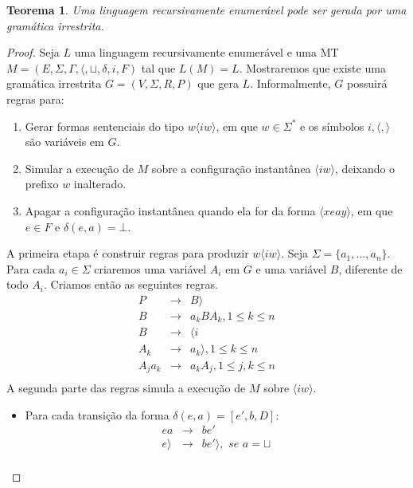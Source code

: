 \documentclass[a4paper]{article}
\newtheorem{Theorem}{Teorema}
\theoremstyle{definition}
\begin{document}
  \begin{Theorem}
    Uma linguagem recursivamente enumerável pode ser gerada por uma gramática
    irrestrita.
  \end{Theorem}
  \begin{proof}
    Seja $L$ uma linguagem recursivamente enumerável e uma MT $M = (E,\Sigma,\Gamma,
    \langle, \sqcup, \delta,i,F)$ tal que $L(M) = L$. Mostraremos que
    existe uma gramática irrestrita $G = (V,\Sigma,R,P)$ que gera $L$.
    Informalmente, $G$ possuirá regras para:
    \begin{enumerate}
      \item Gerar formas sentenciais do tipo $w\langle i w \rangle$, em que $w
        \in \Sigma^*$ e os símbolos $i, \langle, \rangle$ são variáveis em $G$.
      \item Simular a execução de $M$ sobre a configuração instantânea $\langle
        i w\rangle$, deixando o prefixo $w$ inalterado.
      \item Apagar a configuração instantânea quando ela for da forma 
        $\langle x e a y \rangle$, em que $e \in F$ e $\delta(e,a) = \bot$.
    \end{enumerate}
    A primeira etapa é construir regras para produzir $w\langle i w\rangle$. 
    Seja $\Sigma = \{a_1,...,a_n\}$. Para cada $a_i \in \Sigma$ criaremos uma
    variável $A_i$ em $G$ e uma variável $B$, diferente de todo $A_i$. Criamos
    então as seguintes regras.
    \[
      \begin{array}{lcl}
        P & \to & B \rangle \\
        B & \to & a_kBA_k, 1 \leq k \leq n \\
        B & \to & \langle i\\
        A_k & \to & a_k\rangle, 1 \leq k \leq n \\
        A_ja_k & \to & a_kA_j, 1 \leq j, k \leq n\\ 
      \end{array}
    \]
    A segunda parte das regras simula a execução de $M$ sobre $\langle iw
    \rangle$.
    \begin{itemize}
       \item Para cada transição da forma $\delta(e,a) = [e',b,D]$:
         \[
           \begin{array}{lcl}
             ea & \to & be' \\
             e\rangle & \to & be'\rangle, \textit{ se } a = \sqcup\\
           \end{array}
\]
\end{itemize}
\end{proof}
\end{document}
